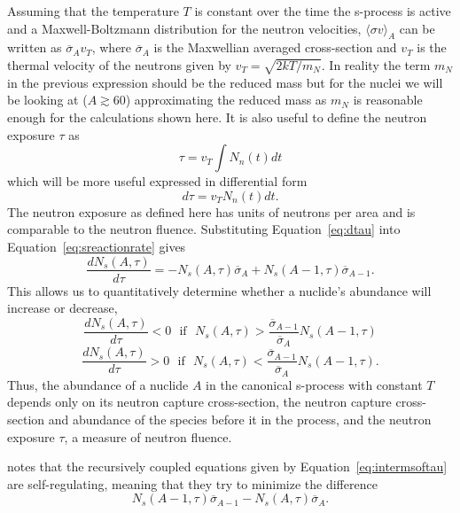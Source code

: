 Assuming that the temperature $T$ is constant over the time the
s-process is active and a Maxwell-Boltzmann distribution 
for the neutron velocities, 
$\langle \sigma v \rangle_A$ can be written as
$ \overline{\sigma}_A v_T$, where $ \overline{\sigma}_A$ is the
Maxwellian averaged cross-section and $v_T$ is the thermal velocity of
the neutrons given by $v_T = \sqrt{2kT/m_N}$.  In reality the term
$m_N$ in the previous expression should be the reduced mass but for the
nuclei we will be looking at ($A \gtrsim 60$) approximating the
reduced mass as $m_N$ is reasonable enough for the calculations shown
here.  It is also useful to define the neutron exposure $\tau$ as
\begin{equation}
\tau = v_T \int N_n(t)dt
\end{equation}
which will be more useful expressed in differential form
\begin{equation}
\label{eq:dtau}
d\tau = v_TN_n(t)dt.
\end{equation}
The neutron exposure as defined here has units of neutrons per area
and is comparable to the neutron fluence.  Substituting
Equation~\ref{eq:dtau} into Equation~\ref{eq:sreactionrate} gives
\begin{equation}
\label{eq:intermsoftau}
\frac{dN_s(A,\tau)}{d\tau} = -N_s(A,\tau)\overline{\sigma}_A +
N_s(A-1,\tau)\overline{\sigma}_{A-1}.
\end{equation}
This allows us to quantitatively determine whether a nuclide's
abundance will increase or decrease,
\begin{equation*}
\frac{dN_s(A,\tau)}{d\tau} < 0 ~~~\textrm{if}~~~ N_s(A,\tau)
> \frac{\overline{\sigma}_{A-1}}{\overline{\sigma}_{A}}N_s(A-1,\tau) 
\end{equation*}
\begin{equation}
\frac{dN_s(A,\tau)}{d\tau} > 0 ~~~\textrm{if}~~~ N_s(A,\tau)
< \frac{\overline{\sigma}_{A-1}}{\overline{\sigma}_{A}}N_s(A-1,\tau).
\end{equation}
Thus, the abundance of a nuclide $A$ in the canonical s-process with
constant $T$ depends only on its neutron capture cross-section, the
neutron capture cross-section and abundance of the species before it 
in the process, and the neutron exposure $\tau$, a measure of neutron
fluence.

\cite{iliadis2008} notes that the recursively coupled equations given
by Equation~\ref{eq:intermsoftau} are self-regulating, meaning that
they try to minimize the difference
\begin{equation}
N_s(A-1,\tau)\overline{\sigma}_{A-1} -
N_s(A,\tau)\overline{\sigma}_{A}.  
\end{equation}

